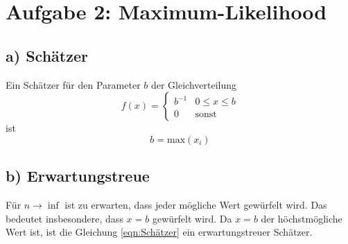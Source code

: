 \section*{Aufgabe 2: Maximum-Likelihood}
\label{sec:Aufgabe2}

\subsection*{a) Schätzer}
\label{sub:Schätzer}
Ein Schätzer für den Parameter $b$ der Gleichverteilung
\begin{equation}
    f(x)=\begin{cases}
        b^{-1} &0\leq x \leq b\\
        0&\text{sonst}
    \end{cases}
\end{equation}
ist
\begin{equation}
    b=\text{max}(x_i)
    \label{eqn:Schätzer}
\end{equation}

\subsection*{b) Erwartungstreue}
\label{sub:Erwartungstreue}
Für $n\rightarrow \inf$ ist zu erwarten, dass jeder mögliche Wert gewürfelt wird.
Das bedeutet insbesondere, dass $x=b$ gewürfelt wird.
Da $x=b$ der höchstmögliche Wert ist, ist die Gleichung \eqref{eqn:Schätzer} ein erwartungstreuer Schätzer.